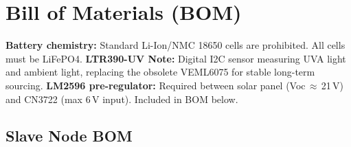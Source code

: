 \documentclass[12pt,a4paper]{article}
\begin{document}
\section{Bill of Materials (BOM)}

\begin{warnbox}
\textbf{Battery chemistry:} Standard Li-Ion/NMC 18650 cells are prohibited. All cells must be LiFePO4. \textbf{LTR390-UV Note:} Digital I2C sensor measuring UVA light and ambient light, replacing the obsolete VEML6075 for stable long-term sourcing. \textbf{LM2596 pre-regulator:} Required between solar panel (Voc\,$\approx$\,21\,V) and CN3722 (max 6\,V input). Included in BOM below.
\end{warnbox}

\subsection{Slave Node BOM}
\end{document}
